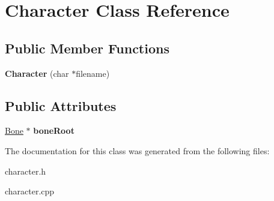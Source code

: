 \hypertarget{class_character}{\section{Character Class Reference}
\label{class_character}
}
\subsection*{Public Member Functions}
\begin{DoxyCompactItemize}
\item 
\hypertarget{class_character_a14d464051325af509f657a439185ac4c}{{\bfseries Character} (char $\ast$filename)}\label{class_character_a14d464051325af509f657a439185ac4c}

\end{DoxyCompactItemize}
\subsection*{Public Attributes}
\begin{DoxyCompactItemize}
\item 
\hypertarget{class_character_afce62006cb61640cecf26aeaade965a1}{\hyperlink{class_bone}{Bone} $\ast$ {\bfseries bone\-Root}}\label{class_character_afce62006cb61640cecf26aeaade965a1}

\end{DoxyCompactItemize}


The documentation for this class was generated from the following files\-:\begin{DoxyCompactItemize}
\item 
character.\-h\item 
character.\-cpp\end{DoxyCompactItemize}
